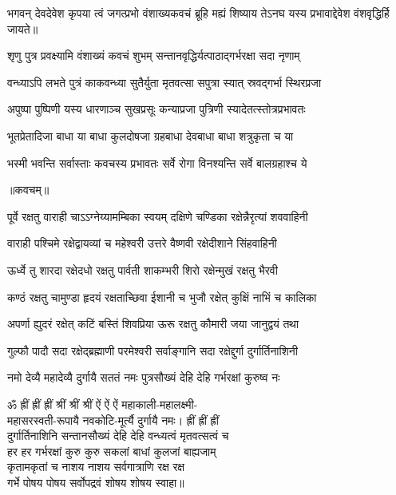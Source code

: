 

\twolineshloka
{भगवन् देवदेवेश कृपया त्वं जगत्प्रभो}
{वंशाख्यकवचं ब्रूहि मह्यं शिष्याय तेऽनघ}%
{यस्य प्रभावाद्देवेश वंशवृद्धिर्हि जायते॥}


\twolineshloka
{शृणु पुत्र प्रवक्ष्यामि वंशाख्यं कवचं शुभम्}
{सन्तानवृद्धिर्यत्पाठाद्गर्भरक्षा सदा नृणाम्}%

\twolineshloka
{वन्ध्याऽपि लभते पुत्रं काकवन्ध्या सुतैर्युता}
{मृतवत्सा सपुत्रा स्यात् स्रवद्गर्भा स्थिरप्रजा}%

\twolineshloka
{अपुष्पा पुष्पिणी यस्य धारणाञ्च सुखप्रसूः}
{कन्याप्रजा पुत्रिणी स्यादेतत्स्तोत्रप्रभावतः}%


\twolineshloka
{भूतप्रेतादिजा बाधा या बाधा कुलदोषजा}
{ग्रहबाधा देवबाधा बाधा शत्रुकृता च या}%

\twolineshloka
{भस्मी भवन्ति सर्वास्ताः कवचस्य प्रभावतः}
{सर्वे रोगा विनश्यन्ति सर्वे बालग्रहाश्च ये}%

\centerline{॥कवचम्॥}

\twolineshloka
{पूर्वे रक्षतु वाराही चाऽऽग्नेय्यामम्बिका स्वयम्}
{दक्षिणे चण्डिका रक्षेन्नैरृत्यां शववाहिनी}%

\twolineshloka
{वाराही पश्चिमे रक्षेद्वायव्यां च महेश्वरी}
{उत्तरे वैष्णवी रक्षेदीशाने सिंहवाहिनी}%

\twolineshloka
{ऊर्ध्वे तु शारदा रक्षेदधो रक्षतु पार्वती}
{शाकम्भरी शिरो रक्षेन्मुखं रक्षतु भैरवी}%

\twolineshloka
{कण्ठं रक्षतु चामुण्डा हृदयं रक्षताच्छिवा}
{ईशानी च भुजौ रक्षेत् कुक्षिं नाभिं च कालिका}%

\twolineshloka
{अपर्णा ह्युदरं रक्षेत् कटिं बस्तिं शिवप्रिया}
{ऊरू रक्षतु कौमारी जया जानुद्वयं तथा}%

\twolineshloka
{गुल्फौ पादौ सदा रक्षेद्ब्रह्माणी परमेश्वरी}
{सर्वाङ्गानि सदा रक्षेद्दुर्गा दुर्गार्तिनाशिनी}%

\twolineshloka
{नमो देव्यै महादेव्यै दुर्गायै सततं नमः}
{पुत्रसौख्यं देहि देहि गर्भरक्षां कुरुष्व नः}%

ॐ ह्रीं ह्रीं ह्रीं श्रीं श्रीं श्रीं ऐं ऐं ऐं महाकाली-महालक्ष्मी-\\
महासरस्वती-रूपायै नवकोटि-मूर्त्यै दुर्गायै नमः। ह्रीं ह्रीं ह्रीं\\
दुर्गार्तिनाशिनि सन्तानसौख्यं देहि देहि वन्ध्यत्वं मृतवत्सत्वं च\\
हर हर गर्भरक्षां कुरु कुरु सकलां बाधां कुलजां बाह्यजाम्\\
कृतामकृतां च नाशय नाशय सर्वगात्राणि रक्ष रक्ष \\
गर्भे पोषय पोषय सर्वोपद्रवं शोषय शोषय स्वाहा॥

